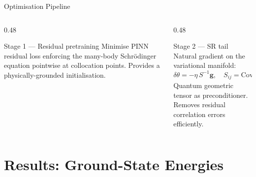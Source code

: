 \documentclass[aspectratio=169,10pt]{beamer}
\begin{document}
\begin{frame}{Optimisation Pipeline}
  \begin{center}
  \end{center}
  \medskip
  \begin{columns}[T]
    \begin{column}{0.48\textwidth}
      \begin{block}{Stage 1 --- Residual pretraining}
        Minimise PINN residual loss enforcing the
        many-body Schr\"odinger equation pointwise at
        collocation points. Provides a
        physically-grounded initialisation.
      \end{block}
    \end{column}
    \begin{column}{0.48\textwidth}
      \begin{block}{Stage 2 --- SR tail}
        Natural gradient on the variational manifold:
        \[
          \delta\theta = -\eta\, S^{-1}\mathbf{g},
          \quad
          S_{ij} = \mathrm{Cov}(O_i,O_j)
        \]
        Quantum geometric tensor as preconditioner.
        Removes residual correlation errors efficiently.
      \end{block}
    \end{column}
  \end{columns}
\end{frame}

\section{Results: Ground-State Energies}
\end{document}
